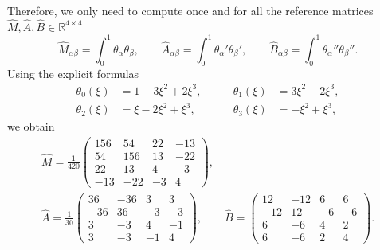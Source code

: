 Therefore, we only need to compute once and for all the reference matrices $\widehat M, \widehat A, \widehat B \in \mathbb R^{4 \times 4}$
\begin{equation*}
    \widehat M_{\alpha \beta} = \int_0^1 \theta_\alpha \theta_\beta, \qquad
    \widehat A_{\alpha \beta} = \int_0^1 \theta_\alpha' \theta_\beta', \qquad
    \widehat B_{\alpha \beta} = \int_0^1 \theta_\alpha'' \theta_\beta''.
\end{equation*}
Using the explicit formulas
\begin{equation*}
    \begin{aligned}
        \theta_0 (\xi) & = 1 - 3 \xi^2 + 2 \xi^3, & \qquad \theta_1 (\xi) & = 3 \xi^2 - 2 \xi^3, \\
        \theta_2 (\xi) & = \xi - 2 \xi^2 + \xi^3, & \qquad \theta_3 (\xi) & = - \xi^2 + \xi^3,
    \end{aligned}
\end{equation*}
we obtain
\begin{gather*}
    \widehat M = \frac{1}{420}
    \begin{pmatrix}
        156 & 54  & 22 & -13 \\
        54  & 156 & 13 & -22 \\
        22  & 13  & 4  & -3  \\
        -13 & -22 & -3 & 4
    \end{pmatrix},
    \\
    \widehat A = \frac{1}{30}
    \begin{pmatrix}
        36  & -36 & 3  & 3  \\
        -36 & 36  & -3 & -3 \\
        3   & -3  & 4  & -1 \\
        3   & -3  & -1 & 4
    \end{pmatrix},
    \qquad
    \widehat B =
    \begin{pmatrix}
        12  & -12 & 6  & 6  \\
        -12 & 12  & -6 & -6 \\
        6   & -6  & 4  & 2  \\
        6   & -6  & 2  & 4
    \end{pmatrix}.
\end{gather*}


